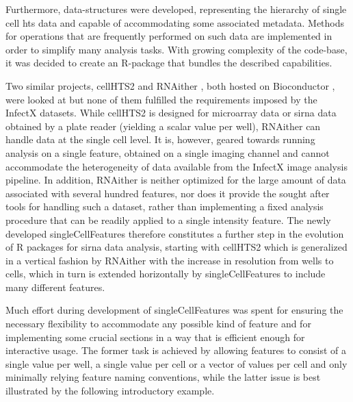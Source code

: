 Furthermore, data-structures were developed, representing the hierarchy of single cell \gls{hts} data and capable of accommodating some associated metadata. Methods for operations that are frequently performed on such data are implemented in order to simplify many analysis tasks. With growing complexity of the code-base, it was decided to create an R-package that bundles the described capabilities.

Two similar projects, cellHTS2 \citep{Boutros2006} and RNAither \citep{Rieber2009}, both hosted on Bioconductor \citep{Huber2015}, were looked at but none of them fulfilled the requirements imposed by the InfectX datasets. While cellHTS2 is designed for microarray data or \gls{sirna} data obtained by a plate reader (yielding a scalar value per well), RNAither can handle data at the single cell level. It is, however, geared towards running analysis on a single feature, obtained on a single imaging channel and cannot accommodate the heterogeneity of data available from the InfectX image analysis pipeline. In addition, RNAither is neither optimized for the large amount of data associated with several hundred features, nor does it provide the sought after tools for handling such a dataset, rather than implementing a fixed analysis procedure that can be readily applied to a single intensity feature. The newly developed singleCellFeatures therefore constitutes a further step in the evolution of R packages for \gls{sirna} data analysis, starting with cellHTS2 which is generalized in a vertical fashion by RNAither with the increase in resolution from wells to cells, which in turn is extended horizontally by singleCellFeatures to include many different features.

Much effort during development of singleCellFeatures was spent for ensuring the necessary flexibility to accommodate any possible kind of feature and for implementing some crucial sections in a way that is efficient enough for interactive usage. The former task is achieved by allowing features to consist of a single value per well, a single value per cell or a vector of values per cell and only minimally relying feature naming conventions, while the latter issue is best illustrated by the following introductory example.




